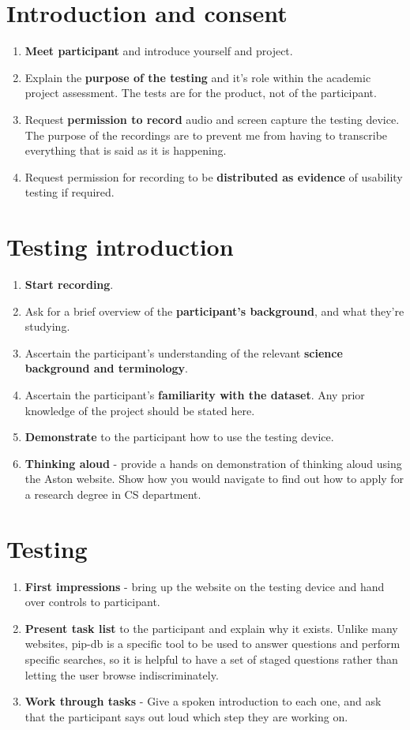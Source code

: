 \documentclass[12pt,twoside]{report}
\begin{document}
\section{Introduction and consent}
\begin{enumerate}
\item \textbf{Meet participant} and introduce yourself and project.
\item Explain the \textbf{purpose of the testing} and it's role within
  the academic project assessment. The tests are for the product, not
  of the participant.
\item Request \textbf{permission to record} audio and screen capture
  the testing device. The purpose of the recordings are to prevent me
  from having to transcribe everything that is said as it is
  happening.
\item Request permission for recording to be \textbf{distributed as
  evidence} of usability testing if required.
\end{enumerate}

\section{Testing introduction}
\begin{enumerate}
\item \textbf{Start recording}.
\item Ask for a brief overview of the \textbf{participant's
  background}, and what they're studying.
\item Ascertain the participant's understanding of the relevant
  \textbf{science background and terminology}.
\item Ascertain the participant's \textbf{familiarity with the
  dataset}. Any prior knowledge of the project should be stated here.
\item \textbf{Demonstrate} to the participant how to use the testing
  device.
\item \textbf{Thinking aloud} - provide a hands on demonstration of
  thinking aloud using the Aston website. Show how you would navigate
  to find out how to apply for a research degree in CS department.
\end{enumerate}

\section{Testing}
\begin{enumerate}
\item \textbf{First impressions} - bring up the website on the testing
  device and hand over controls to participant.
\item \textbf{Present task list} to the participant and explain why it
  exists. Unlike many websites, pip-db is a specific tool to be used
  to answer questions and perform specific searches, so it is helpful
  to have a set of staged questions rather than letting the user
  browse indiscriminately.
\item \textbf{Work through tasks} - Give a spoken introduction to each
  one, and ask that the participant says out loud which step they are
  working on.
\end{enumerate}
\end{document}
